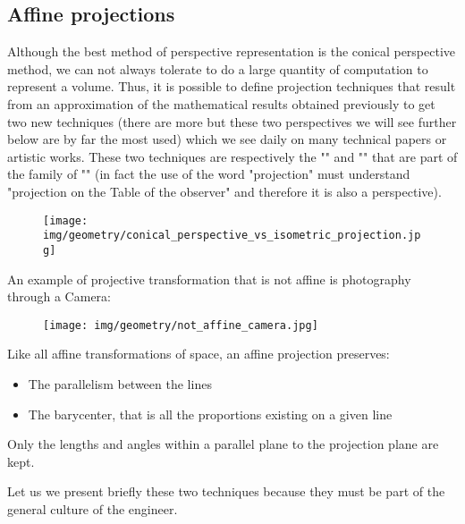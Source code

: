 	\subsection{Affine projections}
	Although the best method of perspective representation is the conical perspective method, we can not always tolerate to do a large quantity of computation to represent a volume. Thus, it is possible to define projection techniques that result from an approximation of the mathematical results obtained previously to get two new techniques (there are more but these two perspectives we will see further below are by far the most used) which we see daily on many technical  papers or artistic works. These two techniques are respectively the "" and "" that are part of the family of  "" (in fact the use of the word "projection" must understand "projection on the Table of the observer" and therefore it is also a perspective).
	\begin{figure}[H]
		\centering
		\texttt{[image: img/geometry/conical\_perspective\_vs\_isometric\_projection.jpg]}
	\end{figure}
	An example of projective transformation that is not affine is photography through a Camera:
	 
	\begin{figure}[H]
		\centering
		\texttt{[image: img/geometry/not\_affine\_camera.jpg]}
	\end{figure}
	Like all affine transformations of space, an affine projection preserves:
	\begin{itemize}
		\item The parallelism between the lines

		\item The barycenter, that is all the proportions existing on a given line
	\end{itemize}
		Only the lengths and angles within a parallel plane to the projection plane are kept.
	
	Let us we present briefly these two techniques because they must be part of the general culture of the engineer.
	
